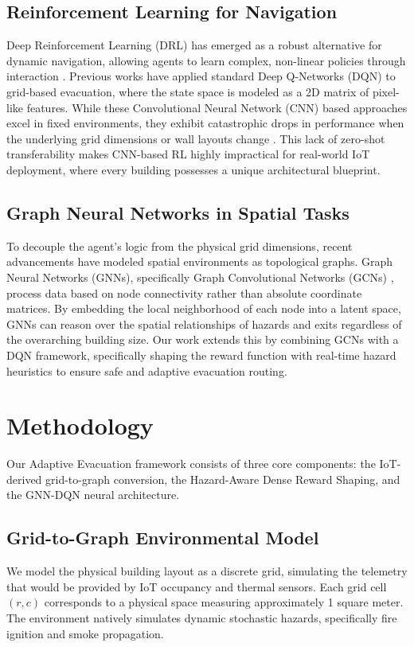 \documentclass[conference]{IEEEtran}
\begin{document}
\subsection{Reinforcement Learning for Navigation}
Deep Reinforcement Learning (DRL) has emerged as a robust alternative for dynamic navigation, allowing agents to learn complex, non-linear policies through interaction \cite{mnih2015human}. Previous works have applied standard Deep Q-Networks (DQN) to grid-based evacuation, where the state space is modeled as a 2D matrix of pixel-like features. While these Convolutional Neural Network (CNN) based approaches excel in fixed environments, they exhibit catastrophic drops in performance when the underlying grid dimensions or wall layouts change \cite{rl_generalization}. This lack of zero-shot transferability makes CNN-based RL highly impractical for real-world IoT deployment, where every building possesses a unique architectural blueprint.

\subsection{Graph Neural Networks in Spatial Tasks}
To decouple the agent's logic from the physical grid dimensions, recent advancements have modeled spatial environments as topological graphs. Graph Neural Networks (GNNs), specifically Graph Convolutional Networks (GCNs) \cite{kipf2016semi}, process data based on node connectivity rather than absolute coordinate matrices. By embedding the local neighborhood of each node into a latent space, GNNs can reason over the spatial relationships of hazards and exits regardless of the overarching building size. Our work extends this by combining GCNs with a DQN framework, specifically shaping the reward function with real-time hazard heuristics to ensure safe and adaptive evacuation routing.

\section{Methodology}
\label{sec:methodology}
Our Adaptive Evacuation framework consists of three core components: the IoT-derived grid-to-graph conversion, the Hazard-Aware Dense Reward Shaping, and the GNN-DQN neural architecture.

\subsection{Grid-to-Graph Environmental Model}
We model the physical building layout as a discrete grid, simulating the telemetry that would be provided by IoT occupancy and thermal sensors. Each grid cell $(r, c)$ corresponds to a physical space measuring approximately 1 square meter. The environment natively simulates dynamic stochastic hazards, specifically fire ignition and smoke propagation. 
\end{document}
